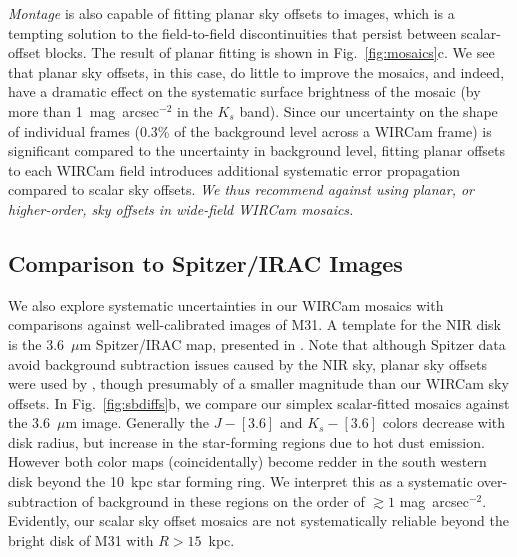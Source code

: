 \documentclass[iop,tighten]{emulateapj}
\newcommand{\sw}[1]{\textit{#1}} %
\newcommand{\androids}{\textsc{androids}}
\newcommand{\Fig}[1]{Fig.~\ref{fig:#1}}  %
\begin{document}

\sw{Montage} is also capable of fitting planar sky offsets to images, which is a tempting solution to the field-to-field discontinuities that persist between scalar-offset blocks.
The result of planar fitting is shown in \Fig{mosaics}c.
We see that planar sky offsets, in this case, do little to improve the mosaics, and indeed, have a dramatic effect on the systematic surface brightness of the mosaic (by more than 1~mag~arcsec$^{-2}$ in the $K_s$ band).
Since our uncertainty on the shape of individual frames (0.3\% of the background level across a WIRCam frame) is significant compared to the uncertainty in background level, fitting planar offsets to each WIRCam field introduces additional systematic error propagation compared to scalar sky offsets.
\textit{We thus recommend against using planar, or higher-order, sky offsets in wide-field WIRCam mosaics.}

\subsection{Comparison to Spitzer/IRAC Images}


We also explore systematic uncertainties in our WIRCam mosaics with comparisons against well-calibrated images of M31.
A template for the NIR disk is the 3.6~$\mu$m Spitzer/IRAC map, presented in \cite{Barmby:2006}.
Note that although Spitzer data avoid background subtraction issues caused by the NIR sky, planar sky offsets were used by \citeauthor{Barmby:2006}, though presumably of a smaller magnitude than our WIRCam sky offsets.
In \Fig{sbdiffs}b, we compare our simplex scalar-fitted mosaics against the 3.6~$\mu$m image.
Generally the $J-[3.6]$ and $K_s-[3.6]$ colors decrease with disk radius, but increase in the star-forming regions due to hot dust emission.
However both color maps (coincidentally) become redder in the south western disk beyond the 10~kpc star forming ring.
We interpret this as a systematic over-subtraction of background in these regions on the order of $\gtrsim 1$ mag~arcsec$^{-2}$.
Evidently, our scalar sky offset mosaics are not systematically reliable beyond the bright disk of M31 with $R>15$~kpc.
\end{document}

